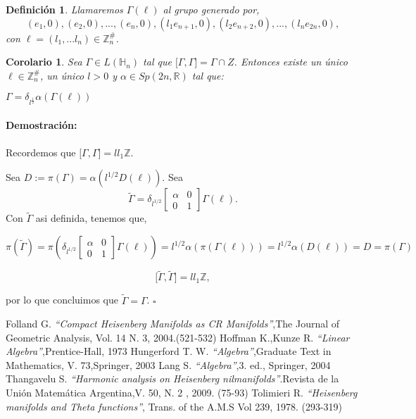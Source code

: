 \documentclass[12pt]{article}
\newtheorem{corollary}{Corolario}
\newtheorem{definition}{Definición}
\newenvironment{proof}{\paragraph{Demostración:}}{\hfill$\square$}
\begin{document}
\begin{definition}
 Llamaremos $\Gamma(\ell)$ al grupo generado por,
 $${(e_1,0),(e_2,0),...,(e_n,0),(l_1 e_{n+1},0),(l_2 e_{n+2},0),...,(l_n e_{2n},0)},$$
 con $\ell=(l_1,...l_n) \in \mathbb{Z}_n^{\#}$.
\end{definition}

\begin{corollary}
 Sea $\Gamma \in L(\mathbb{H}_n)$ tal que ${[}\Gamma,\Gamma{]}=\Gamma \cap Z$. Entonces existe un único $\ell \in  \mathbb{Z}_n^{\#}$, un único $l> 0$  y $\alpha \in Sp(2n,\mathbb{R})$ 
 tal que:
 
 $\Gamma = \delta_{l^{\frac{1}{2}}} \alpha (\Gamma(\ell))$
\end{corollary}
\begin{proof}
 Recordemos que ${[}\Gamma,\Gamma{]}=l l_1 \mathbb{Z}$.
 
 Sea $D:=\pi(\Gamma)=\alpha(l^{1/2} D(\ell))$.
 Sea 
 $$
 \tilde{\Gamma}=   
  \delta_{l^{1/2}}
  \begin{bmatrix}  
    \alpha & 0\\ 
    0& 1
  \end{bmatrix}
  \Gamma(\ell).
$$
 Con $\tilde{\Gamma}$ asi definida, tenemos que,
 
 $$  \pi(\tilde{\Gamma})= 
 \pi(
 \delta_{l^{1/2}}
 \begin{bmatrix}
    \alpha & 0\\ 
    0& 1
  \end{bmatrix}
  \Gamma(\ell)
  )=
  l^{1/2}\alpha(\pi(\Gamma(\ell)))=
  l^{1/2}\alpha(D(\ell))=D=\pi(\Gamma)
  $$
  
  $${[}\tilde{\Gamma},\tilde{\Gamma}{]}=l l_1 \mathbb{Z}, $$
 
 por lo que concluimos que $\tilde{\Gamma}=\Gamma$.
\end{proof}





 \clearpage
  \begin{thebibliography}{1}
  Folland G.  \emph{``Compact Heisenberg Manifolds as CR Manifolds''},The Journal of Geometric Analysis, Vol. 14 N. 3, 2004.(521-532)
  Hoffman K.,Kunze R.  \emph{``Linear Algebra''},Prentice-Hall, 1973  
  Hungerford T. W.  \emph{``Algebra''},Graduate Text in Mathematics, V. 73,Springer, 2003
  Lang S.  \emph{``Algebra''},3. ed., Springer, 2004
  Thangavelu S.  \emph{``Harmonic analysis on Heisenberg nilmanifolds''}.Revista de la Unión Matemática Argentina,V. 50, N. 2 , 2009. (75-93)
  Tolimieri R.   \emph{``Heisenberg manifolds and Theta functions''}, Trans. of the A.M.S Vol 239, 1978. (293-319)
  
  \end{thebibliography}
  
  
  
\end{document}
